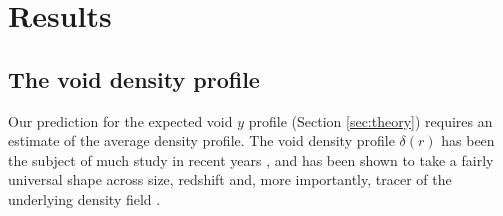 \documentclass[twocolumn,amsfont,amssymb,amsmath, showpacs,balancelastpage, nofootinbib]{revtex4-1}
\begin{document}
  \section{Results}\label{sec:results}
    \subsection{The void density profile}\label{ssec:results.densprof}
      Our prediction for the expected void $y$ profile (Section \ref{sec:theory}) requires
      an estimate of the average density profile. The void density profile $\delta(r)$ has
      been the subject of much study in recent years \cite{2002MNRAS.332..205A,
      2014MNRAS.440..601R,2016IAUS..308..542N}, and has been shown to take a fairly universal
      shape across size, redshift and, more importantly, tracer of the underlying density field
      \cite{2014PhRvL.112y1302H,2014MNRAS.442..462S}.
      
\end{document}
